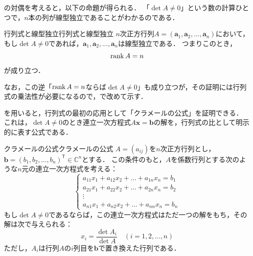 の対偶を考えると，以下の命題が得られる．
「$\det A \ne 0$」という数の計算ひとつで，$n$本の列が線型独立であることがわかるのである．

\begin{prop}{行列式と線型独立}{行列式と線型独立}
  $n$次正方行列$A = (\bm{a}_1, \bm{a}_2, \dots, \bm{a}_n)$において，もし$\det A \ne 0$であれば，$\bm{a}_1, \bm{a}_2, \dots, \bm{a}_n$は線型独立である．
  つまりこのとき，
  \[
  \operatorname{rank} A = n
  \]
  が成り立つ．
\end{prop}

なお，この逆「$\operatorname{rank} A = n$ならば$\det A \ne 0$」も成り立つが，その証明には行列式の乗法性が必要になるので，で改めて示す．

を用いると，行列式の最初の応用として「クラメールの公式」を証明できる．
これは，$\det A \ne 0$のとき連立一次方程式$A\bm{x} = \bm{b}$の解を，行列式の比として明示的に表す公式である．

\begin{prop}{クラメールの公式}{クラメールの公式}
  $A = (a_{ij})$を$n$次正方行列とし，
  $\bm{b} = (b_1, b_2, \dots, b_n)^\mathsf{T} \in \mathbb{C}^n$とする．
  この条件のもと，$A$を係数行列とする次のような$n$元の連立一次方程式を考える：
  \[
  \begin{cases}
    a_{11} x_1 + a_{12} x_2 + \dots + a_{1n} x_n = b_1 \\
    a_{21} x_1 + a_{22} x_2 + \dots + a_{2n} x_n = b_2 \\
    \vdots \\
    a_{n1} x_1 + a_{n2} x_2 + \dots + a_{nn} x_n = b_n
  \end{cases}
  \]
  もし$\det A \ne 0$であるならば，この連立一次方程式はただ一つの解をもち，その解は次で与えられる：
  \[
  x_i = \frac{\det A_i}{\det A}
  \quad (i = 1, 2, \dots, n)
  \]
  ただし，$A_i$は行列$A$の$i$列目を$\bm{b}$で置き換えた行列である．
\end{prop}

